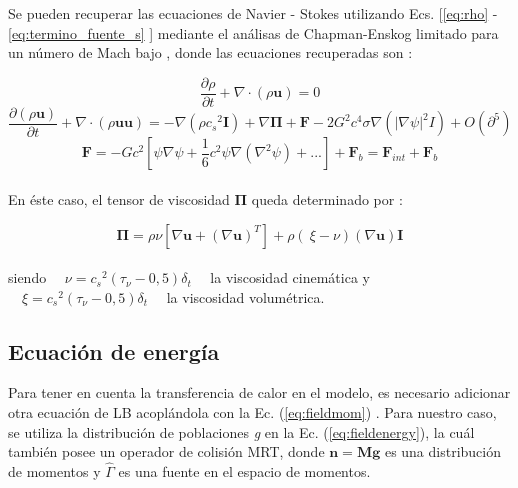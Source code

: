 Se pueden recuperar las ecuaciones de Navier - Stokes utilizando Ecs. [\ref{eq:rho} - \ref{eq:termino_fuente_s} ] mediante el análisas de Chapman-Enskog limitado para un número de Mach bajo \cite{li2013lattice}, donde las ecuaciones recuperadas son \cite{fogliatto2019simulation} \cite{li2013lattice}:

\begin{equation}
	\frac{\partial \rho }{\partial t}  + \nabla \cdot \left( \rho \mathbf{u} \right) = 0
\end{equation}
\begin{equation}
	\frac{\partial \left( \rho \mathbf{u}\right)}{\partial t} + \nabla \cdot \left( \rho \mathbf{u} \mathbf{u}\right) = - \nabla \left( \rho {c_{s}}^{2} \mathbf{I} \right) + \nabla \mathbf{\Pi} + \mathbf{F} - 2 G^{2} c^{4} \sigma \nabla \left( {|\nabla \psi	|}^{2} I	\right) + O (\partial^{5})
\end{equation}
\begin{equation}
\mathbf{F} = - G c^{2} \left[	\psi \nabla \psi + \frac{1}{6} c^{2} \psi \nabla \left( \nabla^{2} \psi\right) + ...\right] + \mathbf{F}_{b} = \mathbf{F}_{int} + \mathbf{F}_{b}
\end{equation}
\\
En éste caso, el tensor de viscosidad $\mathbf{\Pi}$ queda determinado por :

\begin{equation}
	\mathbf{\Pi} = \rho \nu \left[	\nabla \mathbf{u} + {\left(\nabla \mathbf{u}\right)}^{T}\right] + \rho \left(\ \xi - \nu \right) \left( \nabla \mathbf{u}\right) \mathbf{I}
\end{equation}
\\
siendo $\quad\nu = {c_{s}}^{2} (\tau_{\nu}- 0,5) \delta_{t}\quad$ la viscosidad cinemática y $\quad\xi = {c_{s}}^{2} (\tau_{\nu}- 0,5) \delta_{t}\quad$ la viscosidad volumétrica.



\subsection{Ecuación de energía}

Para tener en cuenta la transferencia de calor en el modelo, es necesario adicionar otra ecuación de LB acoplándola con la Ec. (\ref{eq:fieldmom}) \cite{li2013lattice}. Para nuestro caso, se utiliza la distribución de poblaciones \textit{g} en la Ec. (\ref{eq:fieldenergy}), la cuál también posee un operador de colisión MRT, donde $\mathbf{n} = \mathbf{M} \mathbf{g}$ es una distribución de momentos y $\hat{\Gamma}$ es una fuente en el espacio de momentos.


